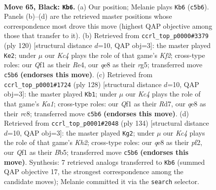 \documentclass[11pt]{article}
\begin{document}
\clearpage

\begin{figure}[p]\centering
\begin{subfigure}{0.46\textwidth}\centering
\resizebox{\linewidth}{!}{%
\newchessgame
\chessboard[
  setfen={4Q3/6KN/8/2k5/8/8/8/5q2 b - - 0 65},
  showmover=false,
  pgfstyle=straightmove, color=movearrow, markmove={c5-b6}
]}
\caption{}
\end{subfigure}\hfill
\begin{subfigure}{0.46\textwidth}\centering
\resizebox{\linewidth}{!}{%
\newchessgame
\chessboard[
  setfen={5n2/5k2/8/6r1/4R3/8/1P3K2/8 w - - 4 61},
  showmover=false,
  pgfstyle=straightmove, color=movearrow, markmove={f2-e2}
]}
\caption{}
\end{subfigure}
\\[4pt]
\begin{subfigure}{0.46\textwidth}\centering
\resizebox{\linewidth}{!}{%
\newchessgame
\chessboard[
  setfen={2r5/3R4/8/8/4P3/4n3/4k3/K7 w - - 18 65},
  showmover=false,
  pgfstyle=straightmove, color=movearrow, markmove={a1-b1}
]}
\caption{}
\end{subfigure}\hfill
\begin{subfigure}{0.46\textwidth}\centering
\resizebox{\linewidth}{!}{%
\newchessgame
\chessboard[
  setfen={8/8/3P4/1B2n3/5k2/8/5p1K/8 w - - 0 68},
  showmover=false,
  pgfstyle=straightmove, color=movearrow, markmove={h2-g2}
]}
\caption{}
\end{subfigure}
\caption{\textbf{Move 65, Black: \texttt{Kb6}.} (a) Our position; Melanie plays \texttt{Kb6} (\texttt{c5b6}). Panels (b)--(d) are the retrieved master positions whose correspondence most drove this move (highest QAP objective among those that transfer to it). (b) Retrieved from \texttt{ccrl\_top\_p0000\#3379} (ply 120) [structural distance $d$=10, QAP obj=3]: the master played \texttt{Ke2}; under $\mu$ our \emph{Kc4} plays the role of that game's \emph{Kf2}; cross-type roles: our \emph{Q}f1 as their \emph{R}e4, our \emph{q}e8 as their \emph{r}g5; transferred move \texttt{c5b6} \textbf{(endorses this move)}. (c) Retrieved from \texttt{ccrl\_top\_p0001\#1724} (ply 128) [structural distance $d$=10, QAP obj=3]: the master played \texttt{Kb1}; under $\mu$ our \emph{Kc4} plays the role of that game's \emph{Ka1}; cross-type roles: our \emph{Q}f1 as their \emph{R}d7, our \emph{q}e8 as their \emph{r}c8; transferred move \texttt{c5b6} \textbf{(endorses this move)}. (d) Retrieved from \texttt{ccrl\_top\_p0001\#2048} (ply 134) [structural distance $d$=10, QAP obj=3]: the master played \texttt{Kg2}; under $\mu$ our \emph{Kc4} plays the role of that game's \emph{Kh2}; cross-type roles: our \emph{q}e8 as their \emph{p}f2, our \emph{Q}f1 as their \emph{B}b5; transferred move \texttt{c5b6} \textbf{(endorses this move)}. Synthesis: 7 retrieved analogs transferred to \texttt{Kb6} (summed QAP objective 17, the strongest correspondence among the candidate moves); Melanie committed it via the \texttt{search} selector.}
\label{fig:thought-m129}
\end{figure}
\end{document}

